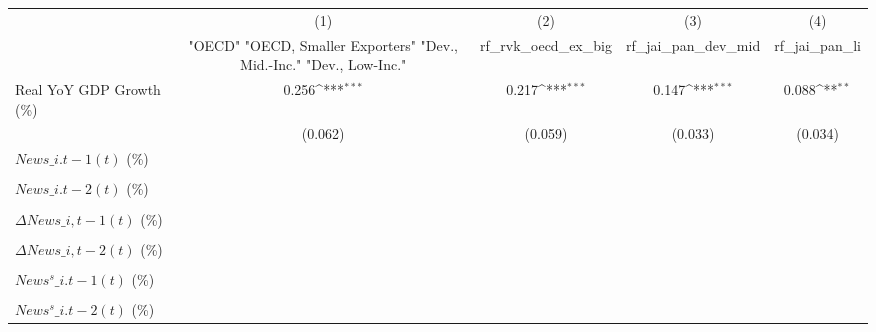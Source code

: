 {
\def\sym#1{\ifmmode^{#1}\else\(^{#1}\)\fi}
\begin{tabular}{l*{4}{c}}
\toprule
                    &\multicolumn{1}{c}{(1)}&\multicolumn{1}{c}{(2)}&\multicolumn{1}{c}{(3)}&\multicolumn{1}{c}{(4)}\\
                    &\multicolumn{1}{c}{ "OECD" "OECD, Smaller Exporters" "Dev., Mid.-Inc." "Dev., Low-Inc."}&\multicolumn{1}{c}{rf\_rvk\_oecd\_ex\_big}&\multicolumn{1}{c}{rf\_jai\_pan\_dev\_mid}&\multicolumn{1}{c}{rf\_jai\_pan\_li}\\
\midrule
Real YoY GDP Growth (\%)&       0.256\sym{***}&       0.217\sym{***}&       0.147\sym{***}&       0.088\sym{**} \\
                    &     (0.062)         &     (0.059)         &     (0.033)         &     (0.034)         \\
\addlinespace
$ News\_{i.t-1}(t)$ (\%)&                     &                     &                     &                     \\
                    &                     &                     &                     &                     \\
\addlinespace
$ News\_{i.t-2}(t)$ (\%)&                     &                     &                     &                     \\
                    &                     &                     &                     &                     \\
\addlinespace
$ \Delta News\_{i,t-1}(t)$ (\%)&                     &                     &                     &                     \\
                    &                     &                     &                     &                     \\
\addlinespace
$ \Delta News\_{i,t-2}(t)$ (\%)&                     &                     &                     &                     \\
                    &                     &                     &                     &                     \\
\addlinespace
$ News^s\_{i.t-1}(t)$ (\%)&                     &                     &                     &                     \\
                    &                     &                     &                     &                     \\
\addlinespace
$ News^s\_{i.t-2}(t)$ (\%)&                     &                     &                     &                     \\

\end{tabular}}

